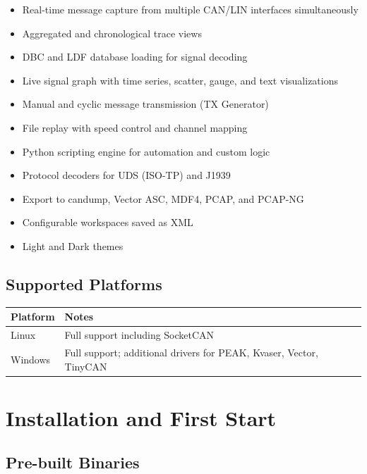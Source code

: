 \documentclass[a4paper,11pt]{article}
\begin{document}
\begin{itemize}[leftmargin=1.5em]
  \item Real-time message capture from multiple CAN/LIN interfaces simultaneously
  \item Aggregated and chronological trace views
  \item DBC and LDF database loading for signal decoding
  \item Live signal graph with time series, scatter, gauge, and text visualizations
  \item Manual and cyclic message transmission (TX Generator)
  \item File replay with speed control and channel mapping
  \item Python scripting engine for automation and custom logic
  \item Protocol decoders for UDS (ISO-TP) and J1939
  \item Export to candump, Vector ASC, MDF4, PCAP, and PCAP-NG
  \item Configurable workspaces saved as XML
  \item Light and Dark themes
\end{itemize}

\subsection{Supported Platforms}

\begin{table}[h]
  \centering
  \begin{tabularx}{0.8\textwidth}{lX}
    \toprule
    \textbf{Platform} & \textbf{Notes} \\
    \midrule
    Linux   & Full support including SocketCAN \\
    Windows & Full support; additional drivers for PEAK, Kvaser, Vector, TinyCAN \\
    \bottomrule
  \end{tabularx}
\end{table}

\section{Installation and First Start}

\subsection{Pre-built Binaries}
\end{document}

